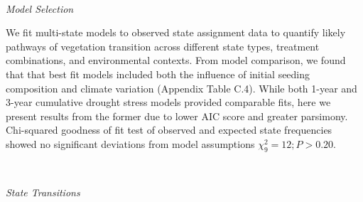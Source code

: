 \documentclass[twoside,12pt,final]{ucthesis-CA2012}
\begin{document}
\begin{ucmainmatter}
~

\emph{Model Selection}

We fit multi-state models to observed state assignment data to quantify likely pathways of vegetation transition across different state types, treatment combinations, and environmental contexts.
From model comparison, we found that that best fit models included both the influence of initial seeding composition and climate variation (Appendix Table C.4).
While both 1-year and 3-year cumulative drought stress models provided comparable fits, here we present results from the former due to lower AIC score and greater parsimony.
Chi-squared goodness of fit test of observed and expected state frequencies showed no significant deviations from model assumptions \(\chi_9^2 = 12; P > 0.20\).

~

\emph{State Transitions}


\end{ucmainmatter}
\end{document}
